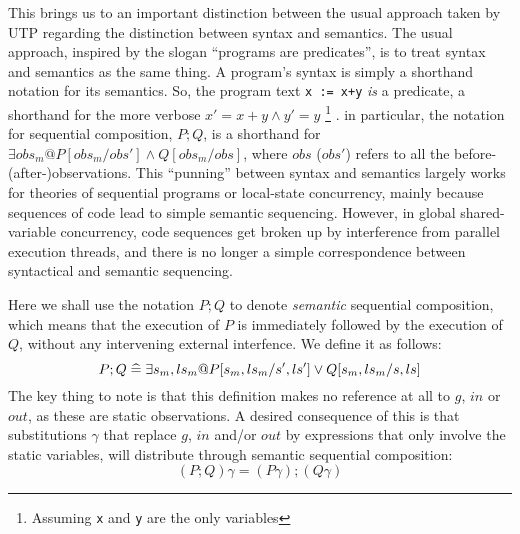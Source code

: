 This brings us to an important distinction between the usual approach
taken by UTP regarding the distinction between syntax and semantics.
The usual approach,
inspired by the slogan ``programs are predicates''\cite{predprog,conf/mlpl/Hoare85},
is to treat syntax and semantics as the same thing.
A program's syntax is simply a shorthand notation for its semantics.
So, the program text \texttt{x := x+y} \emph{is} a predicate,
a shorthand for the more verbose $x' = x + y \land y' = y$
\footnote{Assuming \texttt{x} and \texttt{y} are the only variables}
.
in particular, the notation for sequential composition, $P ; Q$,
is a shorthand for
$\exists obs_m @ P[obs_m/obs'] \land Q[obs_m/obs]$,
where $obs$ ($obs'$) refers to all the before- (after-)observations.
This ``punning'' between syntax and semantics largely works for theories
of sequential programs or local-state concurrency,
mainly because sequences of code lead to simple semantic sequencing.
However, in global shared-variable concurrency,
code sequences get broken up by interference from parallel execution threads,
and there is no longer a simple correspondence between syntactical and semantic
sequencing.

Here we shall use the notation $P;Q$
to denote \emph{semantic} sequential composition,
which means that the execution of $P$ is immediately followed by the
execution of $Q$, without any intervening external interfence.
We define it as follows:
\begin{equation}
   P ; Q \mathrel{\widehat=} \exists s_m, ls_m @ P[s_m,ls_m/s',ls'] \lor Q[s_m,ls_m/s,ls]
   \label{eqn:semantic-;}
\end{equation}
The key thing to note is that this definition makes no reference at all
to $g$, $in$ or $out$,
as these are static observations.
A desired consequence of this is that
substitutions $\gamma$ that
replace $g$, $in$ and/or $out$
by expressions that only involve the static variables,
will distribute through semantic sequential composition:
\begin{equation}
  (P ; Q)\gamma = (P\gamma) ; (Q\gamma)
\end{equation}
